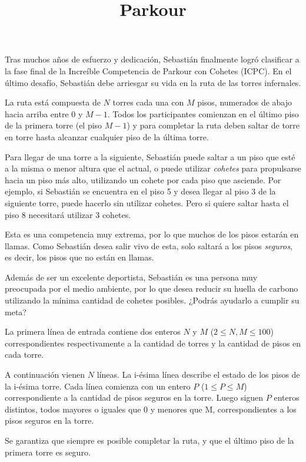 \documentclass{oci}
\title{Parkour}
\begin{document}
\begin{problemDescription}
  Tras muchos años de esfuerzo y dedicación, Sebastián finalmente logró
  clasificar a la fase final de la Increíble Competencia de Parkour con
  Cohetes (ICPC).
  En el último desafío, Sebastián debe arriesgar
  su vida en la ruta de las torres infernales.

  La ruta está compuesta de $N$ torres cada una con
  $M$ pisos, numerados de abajo hacia arriba entre 0
  y $M-1$.
  Todos los participantes comienzan en el último piso de la primera
  torre (el piso $M-1$) y para completar la ruta deben saltar de torre
  en torre hasta alcanzar cualquier piso de la última torre.

  Para llegar de una torre a la siguiente, Sebastián puede saltar a un piso
  que esté a la misma o menor altura que el actual, o puede utilizar \emph{cohetes}
  para propulsarse hacia un piso más alto, utilizando un cohete por cada piso que asciende.
  Por ejemplo, si Sebastián se encuentra en el piso 5 y desea llegar
  al piso 3 de la siguiente torre, puede hacerlo sin utilizar cohetes.
  Pero si quiere saltar hasta el piso 8 necesitará utilizar 3 cohetes.

  Esta es una competencia muy extrema, por lo que muchos de los pisos
  estarán en llamas.
  Como Sebastián desea salir vivo de esta, solo saltará a los pisos
  \emph{seguros}, es decir, los pisos que no están en llamas.

  Además de ser un excelente deportista, Sebastián es una persona muy
  preocupada por el medio ambiente, por lo que desea reducir su huella
  de carbono utilizando la mínima cantidad de cohetes posibles.
  ¿Podrás ayudarlo a cumplir su meta?

\end{problemDescription}

\begin{inputDescription}
  La primera línea de entrada contiene dos enteros $N$ y $M$ ($2 \leq N, M \leq 100$)
  correspondientes respectivamente a la cantidad de torres y la cantidad de pisos en cada torre.

  A continuación vienen $N$ líneas.
  La i-ésima línea describe el estado de los pisos de la i-ésima torre.
  Cada línea comienza con un entero $P$ ($1 \leq P \leq M$) correspondiente
  a la cantidad de pisos seguros en la torre.
  Luego siguen $P$ enteros distintos, todos mayores o iguales que $0$ y menores que M,
  correspondientes a los pisos seguros en la torre.

  Se garantiza que siempre es posible completar la ruta, y que el
  último piso de la primera torre es seguro.
\end{inputDescription}
\end{document}
